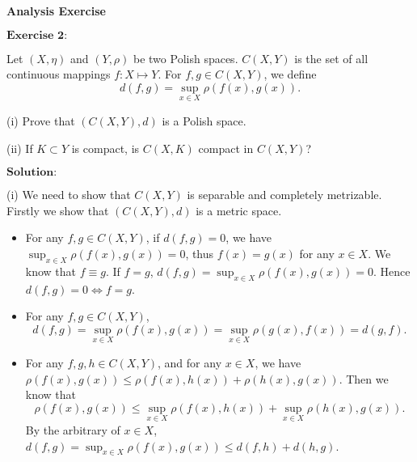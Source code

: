 \documentclass[12pt,a4paper]{ctexart}
\begin{document}
\begin{center}
\textbf{Analysis Exercise}
\vspace{8pt}
\end{center}

\vspace{12pt}

$\textbf{Exercise 2:}$

Let $(X, \eta)$ and $(Y, \rho)$ be two Polish spaces. $C(X, Y)$ is the set of all continuous mappings $f: X \mapsto Y$. For $f, g \in C(X, Y)$, we define
\begin{equation*}
    d(f, g) = \sup_{x \in X} \rho(f(x), g(x)).
\end{equation*}

(i) Prove that $(C(X, Y), d)$ is a Polish space.

(ii) If $K \subset Y$ is compact, is $C(X, K)$ compact in $C(X, Y)$?

\vspace{8pt}

$\textbf{Solution:}$

(i) We need to show that $C(X, Y)$ is separable and completely metrizable. Firstly we show that $(C(X, Y), d)$ is a metric space. 
\begin{itemize}
    \item For any $f, g \in C(X, Y)$, if $d(f, g) = 0$, we have $\sup_{x \in X} \rho(f(x), g(x)) = 0$, thus $f(x) = g(x)$ for any $x \in X$. We know that $f \equiv g$. If $f = g$, $d(f, g) = \sup_{x \in X} \rho(f(x), g(x)) = 0$. Hence $d(f, g) = 0 \iff f = g$.
    \item For any $f, g \in C(X, Y)$, $$d(f, g) = \sup_{x \in X} \rho(f(x), g(x)) = \sup_{x \in X} \rho(g(x), f(x)) = d(g, f).$$
    \item For any $f, g, h \in C(X, Y)$, and for any $x \in X$, we have $\rho(f(x), g(x)) \leq \rho(f(x), h(x)) + \rho(h(x), g(x))$. Then we know that $$\rho(f(x), g(x)) \leq \sup_{x \in X} \rho(f(x), h(x)) + \sup_{x \in X} \rho(h(x), g(x)).$$ By the arbitrary of $x \in X$, $d(f, g) = \sup_{x \in X} \rho(f(x), g(x)) \leq d(f, h) + d(h, g)$.
\end{itemize}
\end{document}
